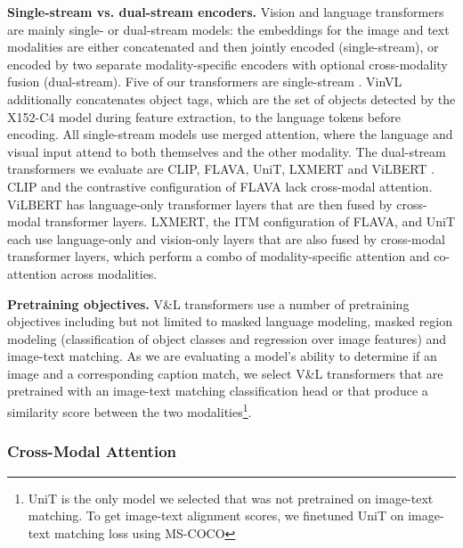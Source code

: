 \documentclass[10pt,twocolumn,letterpaper]{article}
\begin{document}
\textbf{Single-stream vs. dual-stream encoders.} Vision and language transformers are mainly single- or dual-stream models: the embeddings for the image and text modalities are either concatenated and then jointly encoded (single-stream), or encoded by two separate modality-specific encoders with optional cross-modality fusion (dual-stream).
Five of our transformers are single-stream \cite{chen2020uniter, gan2020villa, zhang2021vinvl, kim2021vilt, li2019visualbert}. VinVL additionally concatenates object tags, which are the set of objects detected by the X152-C4 model during feature extraction, to the language tokens before encoding.
All single-stream models use merged attention, where the language and visual input attend to both themselves and the other modality.
The dual-stream transformers we evaluate are CLIP, FLAVA, UniT, LXMERT and ViLBERT \cite{radford2021clip, singh2022flava, hu2021unit, tan2020lxmert, lu2019vilbert}.
CLIP and the contrastive configuration of FLAVA lack cross-modal attention. ViLBERT has language-only transformer layers that are then fused by cross-modal transformer layers.
LXMERT, the ITM configuration of FLAVA, and UniT each use language-only and vision-only layers that are also fused by cross-modal transformer layers, which perform a combo of modality-specific attention and co-attention across modalities.


\textbf{Pretraining objectives.} V\&L transformers use a number of pretraining objectives including but not limited to masked language modeling, masked region modeling (classification of object classes and regression over image features) and image-text matching.
As we are evaluating a model's ability to determine if an image and a corresponding caption match, we select V\&L transformers that are pretrained with an image-text matching classification head or that produce a similarity score between the two modalities\footnote{UniT is the only model we selected that was not pretrained on image-text matching. To get image-text alignment scores, we finetuned UniT on image-text matching loss using MS-COCO\cite{lin2014microsoft}}.

\subsubsection{Cross-Modal Attention}\label{sec:cross-modal-attn}
\end{document}
